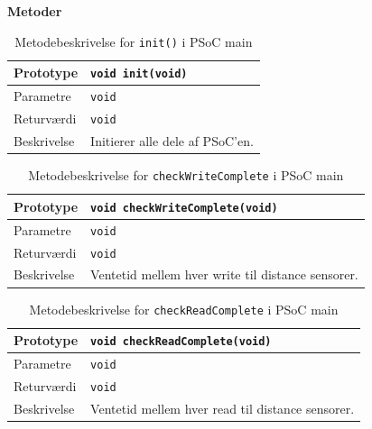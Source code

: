 \clearpage

\textbf{Metoder}

\begin{table}[h]
	\begin{tabularx}{\textwidth}{| L{2.5 cm} | Z |} \hline
	Prototype 	& \texttt{void init(void)} 			\\\hline
	Parametre 	& \texttt{void} 					\newline \\\hline
	Returværdi	& \texttt{void} 					\newline \\\hline
	Beskrivelse	& Initierer alle dele af PSoC'en. 	\newline \\\hline
	\end{tabularx}
	\caption{Metodebeskrivelse for \texttt{init()} i PSoC main}
	\label{table:psoc_init}
\end{table}

\begin{table}[h]
	\begin{tabularx}{\textwidth}{| L{2.5 cm} | Z |} \hline
	Prototype 	& \texttt{void checkWriteComplete(void)}\\\hline
	Parametre 	& \texttt{void}  						\newline \\\hline
	Returværdi	& \texttt{void} 						\newline \\\hline
	Beskrivelse	& Ventetid mellem hver write til distance sensorer. \newline \\\hline
	\end{tabularx}
	\caption{Metodebeskrivelse for \texttt{checkWriteComplete} i PSoC main}
	\label{table:psoc_writecomplete}
\end{table}

\begin{table}[h]
	\begin{tabularx}{\textwidth}{| L{2.5 cm} | Z |} \hline
	Prototype 	& \texttt{void checkReadComplete(void)} \\\hline
	Parametre 	& \texttt{void}  						\newline \\\hline
	Returværdi	& \texttt{void} 						\newline \\\hline
	Beskrivelse	& Ventetid mellem hver read til distance sensorer. \newline \\\hline	
	\end{tabularx}
	\caption{Metodebeskrivelse for \texttt{checkReadComplete} i PSoC main}
	\label{table:psoc_readcomplete}
\end{table}

